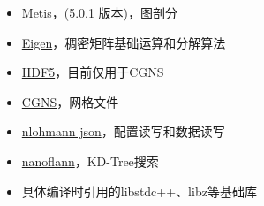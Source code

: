 \documentclass[UTF8,zihao=5]{ctexart} %
\begin{document}
\begin{itemize}
    \item \href{https://github.com/KarypisLab/METIS}{Metis}，(5.0.1 版本)，图剖分
    \item \href{https://eigen.tuxfamily.org/index.php?title=Main_Page}{Eigen}，稠密矩阵基础运算和分解算法
    \item \href{https://www.hdfgroup.org/solutions/hdf5/}{HDF5}，目前仅用于CGNS
    \item \href{http://cgns.github.io/}{CGNS}，网格文件
    \item \href{https://github.com/nlohmann/json}{nlohmann json}，配置读写和数据读写
    \item \href{https://github.com/jlblancoc/nanoflann}{nanoflann}，KD-Tree搜索
    \item 具体编译时引用的libstdc++、libz等基础库
\end{itemize}


{}



























\end{document}
